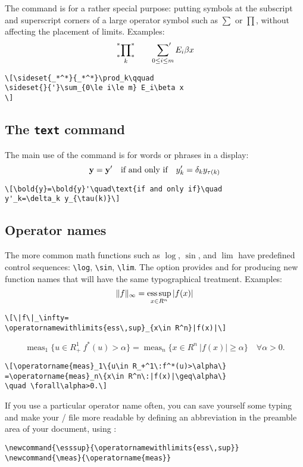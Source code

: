 The command  is for a rather special
purpose: putting symbols at the subscript and superscript
corners of a large operator symbol such as $\sum$ or $\prod$,
without affecting the placement of limits.
Examples:
\[\sideset{_*^*}{_*^*}\prod_k\qquad
\sideset{}{'}\sum_{0\le i\le m} E_i\beta x
\]
\begin{verbatim}
\[\sideset{_*^*}{_*^*}\prod_k\qquad
\sideset{}{'}\sum_{0\le i\le m} E_i\beta x
\]
\end{verbatim}

\subsection{The {\tt\bslash text} command}
The main use of the command  is for words or phrases in a
display:
\[\bold{y}=\bold{y}'\quad\text{if and only if}\quad
y'_k=\delta_k y_{\tau(k)}\]
\begin{verbatim}
\[\bold{y}=\bold{y}'\quad\text{if and only if}\quad
y'_k=\delta_k y_{\tau(k)}\]
\end{verbatim}

\subsection{Operator names}
The more common math functions such as $\log$, $\sin$, and $\lim$ 
have predefined control sequences: \verb=\log=, \verb=\sin=,
\verb=\lim=.
The  option provides  and
for producing new function names that will have the
same typographical treatment.
Examples:
\[\|f\|_\infty=
\operatornamewithlimits{ess\,sup}_{x\in R^n}|f(x)|\]
\begin{verbatim}
\[\|f\|_\infty=
\operatornamewithlimits{ess\,sup}_{x\in R^n}|f(x)|\]
\end{verbatim}
\[\operatorname{meas}_1\{u\in R_+^1\:f^*(u)>\alpha\}
=\operatorname{meas}_n\{x\in R^n\:|f(x)|\geq\alpha\}
\quad \forall\alpha>0.\]
\begin{verbatim}
\[\operatorname{meas}_1\{u\in R_+^1\:f^*(u)>\alpha\}
=\operatorname{meas}_n\{x\in R^n\:|f(x)|\geq\alpha\}
\quad \forall\alpha>0.\]
\end{verbatim}
If you use a particular operator name often, you
can save yourself some typing and make
your \latex/ file more readable by defining an abbreviation
in the preamble area of your document, using :
\begin{verbatim}
\newcommand{\esssup}{\operatornamewithlimits{ess\,sup}}
\newcommand{\meas}{\operatorname{meas}}
\end{verbatim}

